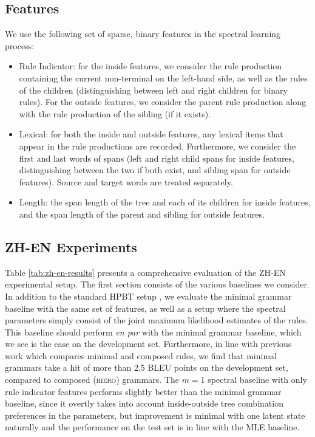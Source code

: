 \documentclass[11pt]{article}
\begin{document}
\subsection{Features}
\label{sec:features}
We use the following set of sparse, binary features in the spectral learning process:
\begin{itemize}[noitemsep]
	\item Rule Indicator: for the inside features, we consider the rule production containing the current non-terminal on the left-hand side, as well as the rules of the children (distinguishing between left and right children for binary rules).  
	For the outside features, we consider the parent rule production along with the rule production of the sibling (if it exists). 
	\item Lexical: for both the inside and outside features, any lexical items that appear in the rule productions are recorded.  
	Furthermore, we consider the first and last words of spans (left and right child spans for inside features, distinguishing between the two if both exist, and sibling span for outside features).  
	Source and target words are treated separately. 
	\item Length: the span length of the tree and each of its children for inside features, and the span length of the parent and sibling for outside features. 	
\end{itemize}

\subsection{\textsc{ZH-EN} Experiments}
Table \ref{tab:zh-en-results} presents a comprehensive evaluation of the \textsc{ZH-EN} experimental setup.  
The first section consists of the various baselines we consider. 
In addition to the standard HPBT setup \cite{Chiang2005}, we evaluate the minimal grammar baseline with the same set of features, as well as a setup where the spectral parameters simply consist of the joint maximum likelihood estimates of the rules.  
This baseline should perform \emph{en par} with the minimal grammar baseline, which we see is the case on the development set.  
Furthermore, in line with previous work \cite{Galley2006} which compares minimal and composed rules, we find that minimal grammars take a hit of more than 2.5 BLEU points on the development set, compared to composed (\textsc{hiero}) grammars.  
The $m=1$ spectral baseline with only rule indicator features performs slightly better than the minimal grammar baseline, since it overtly takes into account inside-outside tree combination preferences in the parameters, but improvement is minimal with one latent state naturally and the performance on the test set is in line with the MLE baseline.  
\end{document}
